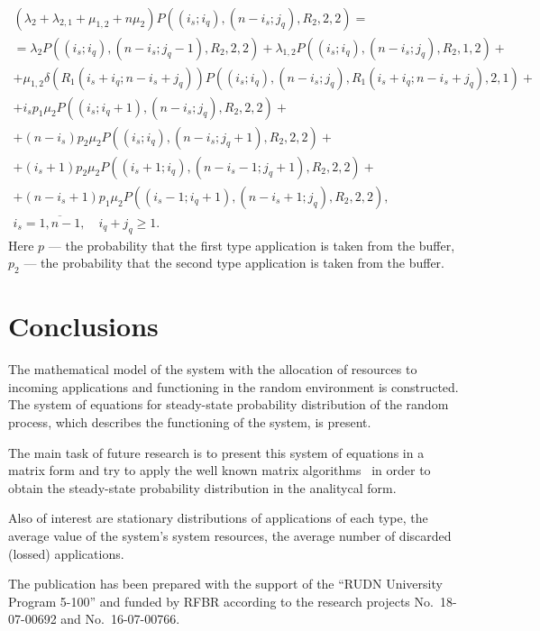 {\begin{multline}
\label{eq:10.3}
\end{multline}
\begin{multline}
  \left(\lambda_2 +\lambda_{2,1}+\mu_{1,2}+n\mu_2\right)
  P\left((i_s;i_q),(n-i_s;j_q),R_2,2,2\right) = \\ =
  \lambda_2 P\left((i_s;i_q),(n-i_s;j_q-1),R_2,2,2\right) +
  \lambda_{1,2} P\left((i_s;i_q),(n-i_s;j_q),R_2,1,2\right) + \\ +
  \mu_{1,2}  \delta\left(R_1(i_s+i_q; n-i_s+j_q)\right)
  P\left((i_s;i_q),(n-i_s;j_q),R_1(i_s+i_q; n-i_s+j_q),2,1\right) + \\ +
  i_s p_1\mu_2  P\left((i_s;i_q+1),(n-i_s;j_q),R_2,2,2\right) + \\ +
  (n-i_s) p_2 \mu_2  P\left((i_s;i_q),(n-i_s;j_q+1),R_2,2,2\right) +
  \\ +
  (i_s+1) p_2 \mu_2  P\left((i_s+1;i_q),(n-i_s-1;j_q+1),R_2,2,2\right)
  + \\ +
  (n-i_s+1) p_1\mu_2 P\left((i_s-1;i_q+1),(n-i_s+1;j_q),R_2,2,2\right), \\
  i_s=\overline{1,n-1},\quad  i_q+j_q\geqslant  1.
\label{eq:10.4}
\end{multline}
Here $p$ --- the probability that the first type application is taken
from the buffer, $p_2$ --- the probability that the second type
application is taken from the buffer.


\section{Conclusions}

The mathematical model of the system with the allocation of resources
to incoming applications and functioning in the random environment is
constructed. The system of equations for steady-state probability
distribution of the random process, which describes the functioning of
the system, is present.

The main task of future research is to present this system of
equations in a matrix form and try to apply the well known matrix
algorithms~\cite{Neuts4,Neuts5,MMAP-book1,MMAP-book2,MMAP-book4} in
order to obtain the steady-state probability distribution in the
analitycal form.

Also of interest are stationary distributions of applications of each
type, the average value of the system's system resources, the average
number of discarded (lossed) applications.


\begin{acknowledgments}
The publication has been prepared with the support of the
  ``RUDN University Program 5-100'' and funded by RFBR according to
  the research projects No.~18-07-00692 and No.~16-07-00766.
\end{acknowledgments}


\putbib[cite]

\makealttitle

} %


